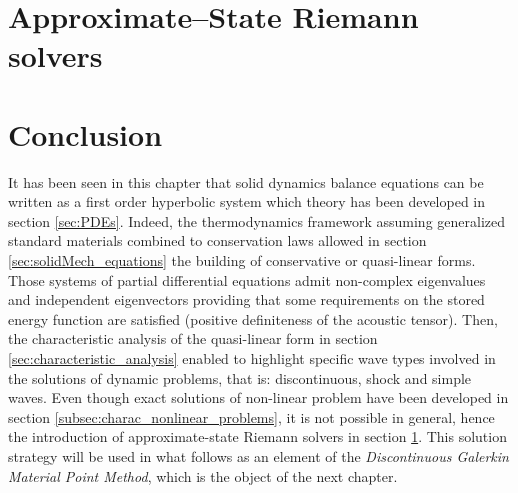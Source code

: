 \section{Approximate--State Riemann solvers}
\label{sec:riemann_solvers}


\section*{Conclusion}
It has been seen in this chapter that solid dynamics balance equations can be written as a first order hyperbolic system which theory has been developed in section \ref{sec:PDEs}. Indeed, the thermodynamics framework assuming generalized standard materials combined to conservation laws allowed in section \ref{sec:solidMech_equations} the building of conservative or quasi-linear forms. Those systems of partial differential equations admit non-complex eigenvalues and independent eigenvectors providing that some requirements on the stored energy function are satisfied (positive definiteness of the acoustic tensor). Then, the characteristic analysis of the quasi-linear form in section \ref{sec:characteristic_analysis} enabled to highlight specific wave types involved in the solutions of dynamic problems, that is: discontinuous, shock and simple waves. Even though exact solutions of non-linear problem have been developed in section \ref{subsec:charac_nonlinear_problems}, it is not possible in general, hence the introduction of approximate-state Riemann solvers in section \ref{sec:riemann_solvers}. This solution strategy will be used in what follows as an element of the \textit{Discontinuous Galerkin Material Point Method}, which is the object of the next chapter.

